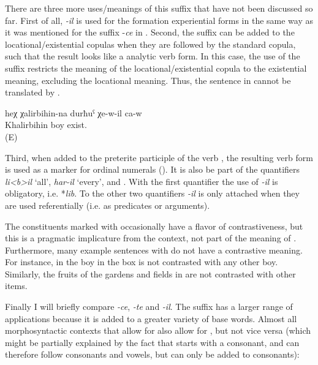 There are three more uses\slash meanings of this suffix that have not been discussed so far. First of all, \textit{-il} is used for the formation experiential forms in the same way as it was mentioned for the suffix -\textit{ce} in . Second, the suffix  can be added to the locational/existential copulas when they are followed by the standard copula, such that the result looks like a analytic verb form. In this case, the use of the suffix restricts the meaning of the locational/existential copula to the existential meaning, excluding the locational meaning. Thus, the sentence in  cannot be translated by .
%
\begin{exe}
	\ex	\label{ex:The son of Khalirbihin should be there (i.e. be still alive) minor}
	\gll	heχ	χalirbihin-na	durħuˁ	χe-w-il	ca-w\\
			Khalirbihin	boy	exist.	\\
	\glt	{} (E)
\end{exe}
	
Third, when added to the preterite participle of the verb  , the resulting verb form is used as a marker for ordinal numerals (). It is also be part of the quantifiers \textit{li<b>il} `all', \textit{har-il} `every', and  . With the first quantifier the use of \textit{-il} is obligatory, i.e. *\textit{lib}. To the other two quantifiers \textit{-il} is only attached when they are used referentially (i.e. as predicates or arguments). 

The constituents marked with  occasionally have a flavor of contrastiveness, but this is a pragmatic implicature from the context, not part of the meaning of . Furthermore, many example sentences with  do not have a contrastive meaning. For instance, in  the boy in the box is not contrasted with any other boy. Similarly, the fruits of the gardens and fields in  are not contrasted with other items.

Finally I will briefly compare \textit{-ce}, \textit{-te} and \textit{-il}. The suffix  has a larger range of applications because it is added to a greater variety of base words. Almost all morphosyntactic contexts that allow for  also allow for , but not vice versa (which might be partially explained by the fact that  starts with a consonant, and can therefore follow consonants and vowels, but  can only be added to consonants):

